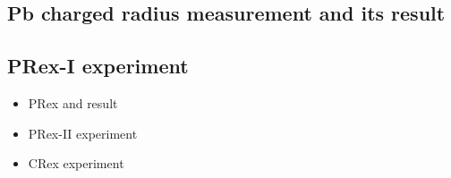 \subsection{Pb charged radius measurement and its result }

\subsection{PRex-I experiment}

\begin{itemize}
    \item PRex and result
\end{itemize}

\begin{itemize}
    \item PRex-II experiment 
\end{itemize}

\begin{itemize}
    \item CRex experiment
\end{itemize}